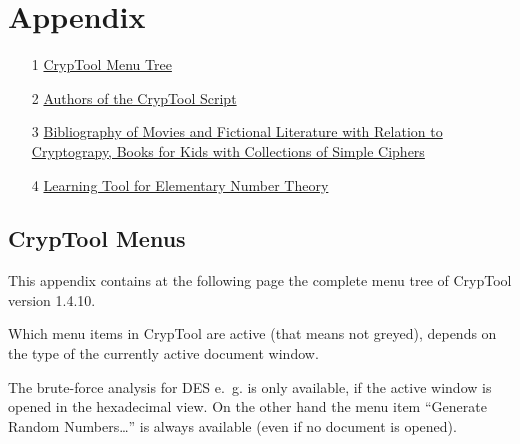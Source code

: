
\newpage
\hypertarget{appendix-start}{}\label{s:appendix-start}

\section{Appendix}

    \begin{itemize}

      \item[1] \hyperlink{appendix-menutree}{CrypTool Menu Tree}

      \item[2] \hyperlink{appendix-authors}{Authors of the CrypTool Script}

      \item[3] \hyperlink{appendix-authors}{Bibliography of Movies and
                     Fictional Literature with Relation to Cryptograpy,
                     Books for Kids with Collections of Simple Ciphers}

      \item[4] \hyperlink{appendix-Learn-NT}
                     {Learning Tool for Elementary Number Theory}

    \end{itemize}




\newpage
\enlargethispage{1cm}
\hypertarget{appendix-menutree}{}
\subsection{CrypTool Menus}
\label{s:appendix-menutree}

This appendix contains at the following page the complete menu tree of
CrypTool version 1.4.10. 

Which menu items in CrypTool are active (that means not greyed), depends on
the type of the currently active document window.

The brute-force analysis for DES e.~g. is only
available, if the active window is opened in the hexadecimal view. 
On the other hand the menu item ``Generate Random Numbers\dots''
is always available (even if no document is opened).



